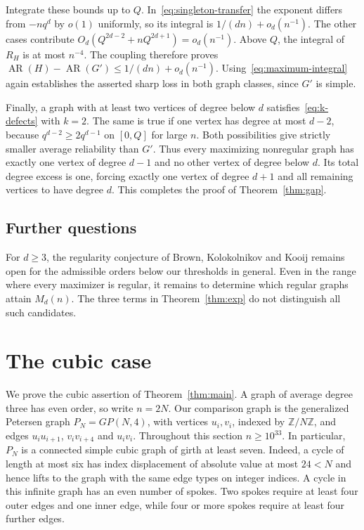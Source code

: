 \documentclass[11pt,reqno]{amsart}
\theoremstyle{remark}
\numberwithin{equation}{section}
\newcommand{\AR}{\operatorname{AR}}
\begin{document}
Integrate these bounds up to $Q$. In~\eqref{eq:singleton-transfer}
the exponent differs from $-nq^d$ by $o(1)$ uniformly, so its integral
is $1/(dn)+o_d(n^{-1})$.
The other cases contribute
$O_d(Q^{2d-2}+nQ^{2d+1})=o_d(n^{-1})$.
Above $Q$, the integral of $R_H$ is at most $n^{-4}$.
The coupling therefore proves
$\AR(H)-\AR(G')\le1/(dn)+o_d(n^{-1})$.
Using~\eqref{eq:maximum-integral} again establishes the asserted sharp
loss in both graph classes, since $G'$ is simple.

Finally, a graph with at least two vertices of degree below $d$
satisfies~\eqref{eq:k-defects} with $k=2$.
The same is true if one vertex has degree at most $d-2$, because
$q^{d-2}\ge2q^{d-1}$ on $[0,Q]$ for large $n$.
Both possibilities give strictly smaller average reliability than $G'$.
Thus every maximizing nonregular graph has exactly one vertex of degree
$d-1$ and no other vertex of degree below $d$.
Its total degree excess is one, forcing exactly one vertex of degree
$d+1$ and all remaining vertices to have degree $d$.
This completes the proof of Theorem~\ref{thm:gap}.

\subsection*{Further questions}
For $d\ge3$, the regularity conjecture of Brown, Kolokolnikov and Kooij remains open for the admissible orders below our thresholds in general. Even in the range where every maximizer is regular, it remains to determine which regular graphs attain $M_d(n)$. The three terms in Theorem~\ref{thm:exp} do not distinguish all such candidates.

\appendix

\section{The cubic case}\label{sec:cubic}

We prove the cubic assertion of Theorem~\ref{thm:main}. A graph of
average degree three has even order, so write $n=2N$. Our comparison
graph is the generalized Petersen graph $P_N=GP(N,4)$, with vertices
$u_i,v_i$, indexed by $\mathbb Z/N\mathbb Z$, and edges
$u_iu_{i+1}$, $v_iv_{i+4}$ and $u_iv_i$. Throughout this section
$n\ge10^{33}$. In particular, $P_N$ is a connected simple cubic graph
of girth at least seven. Indeed, a cycle of length at most six has
index displacement of absolute value at most $24<N$ and hence lifts
to the graph with the same edge types on integer indices. A cycle
in this infinite graph has an even number of spokes. Two spokes
require at least four outer edges and one inner edge, while four or
more spokes require at least four further edges.
\end{document}
